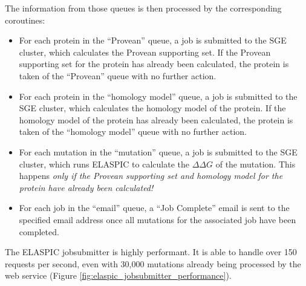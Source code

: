 The information from those queues is then processed by the corresponding coroutines:

\vspace{-\topsep}
\begin{itemize}
	\itemsep0em
	\item For each protein in the ``Provean'' queue, a job is submitted to the SGE cluster, which calculates the Provean supporting set. If the Provean supporting set for the protein has already been calculated, the protein is taken of the ``Provean'' queue with no further action.
	\item For each protein in the ``homology model'' queue, a job is submitted to the SGE cluster, which calculates the homology model of the protein. If the homology model of the protein has already been calculated, the protein is taken of the ``homology model'' queue with no further action.
	\item For each mutation in the ``mutation'' queue, a job is submitted to the SGE cluster, which runs ELASPIC to calculate the $\Delta \Delta G$ of the mutation. This happens \textit{only if the Provean supporting set and homology model for the protein have already been calculated!}
	\item For each job in the ``email'' queue, a ``Job Complete'' email is sent to the specified email address once all mutations for the associated job have been completed.
\end{itemize}

The ELASPIC jobsubmitter is highly performant. It is able to handle over 150 requests per second, even with 30,000 mutations already being processed by the web service (Figure \ref{fig:elaspic_jobsubmitter_performance}).

